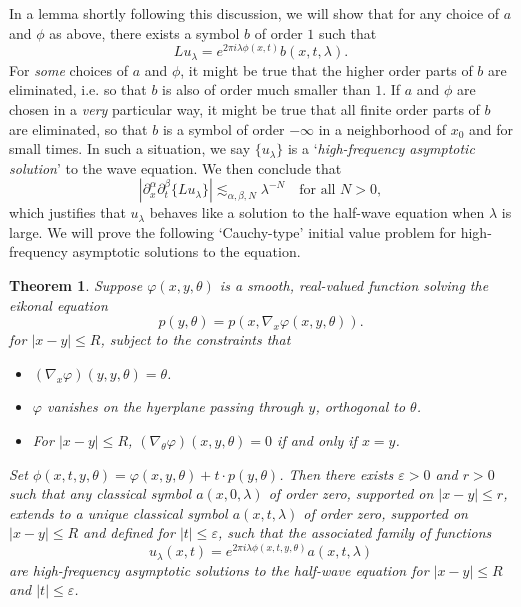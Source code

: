\documentclass{article}
\theoremstyle{plain}
\newtheorem{theorem}{Theorem}
\theoremstyle{remark}
\theoremstyle{definition}
\begin{document}
In a lemma shortly following this discussion, we will show that for any choice of $a$ and $\phi$ as above, there exists a symbol $b$ of order $1$ such that
%
\[ L u_\lambda = e^{2 \pi i \lambda \phi(x,t)} b(x,t,\lambda). \]
%
For \emph{some} choices of $a$ and $\phi$, it might be true that the higher order parts of $b$ are eliminated, i.e. so that $b$ is also of order much smaller than $1$. If $a$ and $\phi$ are chosen in a \emph{very} particular way, it might be true that all finite order parts of $b$ are eliminated, so that $b$ is a symbol of order $-\infty$ in a neighborhood of $x_0$ and for small times. In such a situation, we say $\{ u_\lambda \}$ is a `\emph{high-frequency asymptotic solution}' to the wave equation. We then conclude that
%
\[ |\partial_x^\alpha \partial_t^\beta \{ L u_\lambda \}| \lesssim_{\alpha,\beta,N} \lambda^{-N} \quad\text{for all $N > 0$}, \]
which justifies that $u_\lambda$ behaves like a solution to the half-wave equation when $\lambda$ is large. We will prove the following `Cauchy-type' initial value problem for high-frequency asymptotic solutions to the equation.

\begin{theorem}
	Suppose $\varphi(x,y,\theta)$ is a smooth, real-valued function solving the \emph{eikonal equation}
	\[ p(y,\theta) = p(x, \nabla_x \varphi(x,y,\theta)). \]
	for $|x - y| \leq R$, subject to the constraints that
	\begin{itemize}
		\item $(\nabla_x \varphi)(y,y,\theta) = \theta$.

		\item $\varphi$ vanishes on the hyerplane passing through $y$, orthogonal to $\theta$.

		\item For $|x - y| \leq R$, $(\nabla_\theta \varphi)(x,y,\theta) = 0$ if and only if $x = y$.
	\end{itemize}
 	Set $\phi(x,t,y,\theta) = \varphi(x,y,\theta) + t \cdot p(y,\theta)$. Then there exists $\varepsilon > 0$ and $r > 0$ such that any classical symbol $a(x,0,\lambda)$ of order zero, supported on $|x - y| \leq r$, extends to a unique classical symbol $a(x,t,\lambda)$ of order zero, supported on $|x - y| \leq R$ and defined for $|t| \leq \varepsilon$, such that the associated family of functions
	\[ u_\lambda(x,t) = e^{2 \pi i \lambda \phi(x,t,y,\theta)} a(x,t,\lambda) \]
	are high-frequency asymptotic solutions to the half-wave equation for $|x - y| \leq R$ and $|t| \leq \varepsilon$.
\end{theorem}
\end{document}
